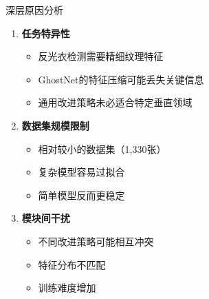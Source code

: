 \documentclass[aspectratio=169]{beamer}
\begin{document}
\begin{frame}{深层原因分析}
    \begin{enumerate}
        \item \textbf{任务特异性}
        \begin{itemize}
            \item 反光衣检测需要精细纹理特征
            \item GhostNet的特征压缩可能丢失关键信息
            \item 通用改进策略未必适合特定垂直领域
        \end{itemize}
        
        \item \textbf{数据集规模限制}
        \begin{itemize}
            \item 相对较小的数据集（1,330张）
            \item 复杂模型容易过拟合
            \item 简单模型反而更稳定
        \end{itemize}
        
        \item \textbf{模块间干扰}
        \begin{itemize}
            \item 不同改进策略可能相互冲突
            \item 特征分布不匹配
            \item 训练难度增加
        \end{itemize}
    \end{enumerate}
\end{frame}
\end{document}
